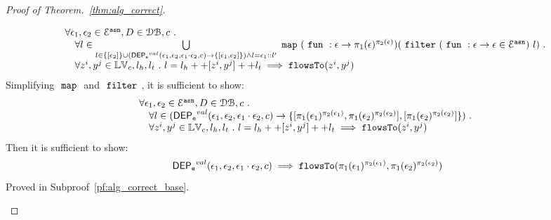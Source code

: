 \documentclass[a4paper,11pt]{article}
\begin{document}
\begin{proof}[Proof of Theorem.~\ref{thm:alg_correct}]
\begin{case}
\[\begin{array}{l}
  \forall \mathtt{\epsilon}_1, \mathtt{\epsilon}_2 \in \mathcal{E}^{\mathtt{{asn}}}, D \in \mathcal{DB} , c ~.~
  \\ \quad 
   \forall l \in  \bigcup\limits_{l \in \{[\mathtt{\epsilon}_2]\} \cup
   (\mathsf{DEP_{\mathtt{e}}}^{val}(\mathtt{\epsilon}_1, \mathtt{\epsilon}_2, \mathtt{\epsilon}_1 \cdot \mathtt{\epsilon}_2, c) \to
       \{[\mathtt{\epsilon}_1, \mathtt{\epsilon}_2]\}) \land l = \mathtt{\epsilon}_1 :: l'}
  ~\mathtt{map}~ 
  (~\mathtt{fun}~ : \mathtt{\epsilon} \to \pi_1(\mathtt{\epsilon})^{\pi_2(\mathtt{\epsilon})})  
  (~\mathtt{filter}~ 
    (~\mathtt{fun}~ : \mathtt{\epsilon} \to  \mathtt{\epsilon} \in \mathcal{E}^{\mathtt{{asn}}}) ~ l)
 ~.~
   \\ \quad 
   \forall z^i, y^j \in \mathbb{LV}_c, l_h, l_t ~.~ 
   l = l_h ++ [z^i, y^j] ++ l_t 
   \implies \mathtt{flowsTo}(z^i, y^j)
\end{array}
\]
%
Simplifying $~\mathtt{map}~$ and $~\mathtt{filter}~$, it is sufficient to show:
\[
\begin{array}{l}
  \forall \mathtt{\epsilon}_1, \mathtt{\epsilon}_2 \in \mathcal{E}^{\mathtt{{asn}}}, D \in \mathcal{DB} , c ~.~
  \\ \quad 
   \forall l \in 
   (\mathsf{DEP_{\mathtt{e}}}^{val}(\mathtt{\epsilon}_1, \mathtt{\epsilon}_2, \mathtt{\epsilon}_1 \cdot \mathtt{\epsilon}_2, c) \to 
       \{[\pi_1(\mathtt{\epsilon}_1)^{\pi_2(\mathtt{\epsilon}_1)}, \pi_1(\mathtt{\epsilon}_2)^{\pi_2(\mathtt{\epsilon}_2)}], [\pi_1(\mathtt{\epsilon}_2)^{\pi_2(\mathtt{\epsilon}_2)}]\})
 ~.~
   \\ \quad 
   \forall z^i, y^j \in \mathbb{LV}_c, l_h, l_t ~.~ 
   l = l_h ++ [z^i, y^j] ++ l_t 
   \implies \mathtt{flowsTo}(z^i, y^j)
\end{array}
\]
%
Then it is sufficient to show:
%
\[
  \mathsf{DEP_{\mathtt{e}}}^{val}(\mathtt{\epsilon}_1, \mathtt{\epsilon}_2, \mathtt{\epsilon}_1 \cdot \mathtt{\epsilon}_2, c) \implies \mathtt{flowsTo}(\pi_1(\mathtt{\epsilon}_1)^{\pi_2(\mathtt{\epsilon}_1)}, \pi_1(\mathtt{\epsilon}_2)^{\pi_2(\mathtt{\epsilon}_2)})
\]
% 
Proved in Subproof~\ref{pf:alg_correct_base}.


\end{case}
\end{proof}
\end{document}

